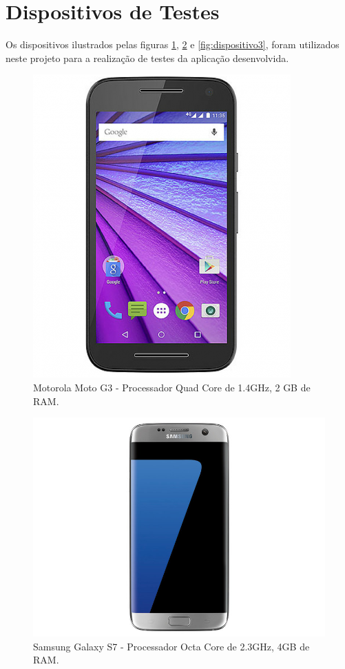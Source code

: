 
\section{Dispositivos de Testes}\label{sec:dispositivos}

Os dispositivos ilustrados pelas figuras \ref{fig:dispositivo1}, \ref{fig:dispositivo2} e \ref{fig:dispositivo3}, foram utilizados neste projeto para a realização de testes da aplicação desenvolvida.

	\begin{figure}[!htb]
       \begin{center}  
          \includegraphics[width=0.3\columnwidth]{img/dispositivo1.jpg}
           \caption{\label{fig:dispositivo1}Motorola Moto G3 - Processador Quad Core de 1.4GHz, 2 GB de RAM.}
       \end{center}
   \end{figure}
   
	\begin{figure}[!htb]
       \begin{center}  
          \includegraphics[width=0.5\columnwidth]{img/dispositivo2.jpg}
           \caption{\label{fig:dispositivo2}Samsung Galaxy S7 - Processador Octa Core de 2.3GHz, 4GB de RAM.}
       \end{center}
   \end{figure}
   
